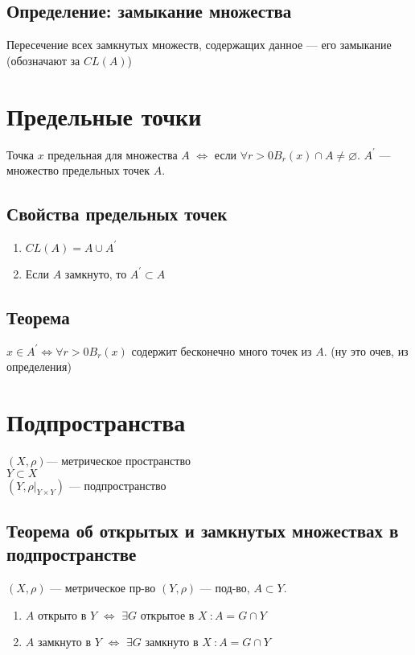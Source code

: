 \documentclass[12pt]{report} %
\begin{document}
\subsection*{Определение: замыкание множества}
Пересечение всех замкнутых множеств, содержащих данное --- его замыкание (обозначают за $CL(A)$)

\section*{Предельные точки}

Точка $x$ предельная для множества $A$ $\Leftrightarrow$ если $\forall r > 0 B_r(x) \cap A \neq \varnothing$. $A^{\prime}$ --- множество предельных точек $A$.

\subsection*{Свойства предельных точек}

\begin{enumerate}
\item $CL(A) = A \cup A^{\prime}$
\item Если $A$ замкнуто, то $A^{\prime} \subset A$
\end{enumerate}

\subsection*{Теорема}
$x \in A^{\prime} \Leftrightarrow \forall r > 0 B_r(x)$ содержит бесконечно много точек из $A$. (ну это очев, из определения)
\section*{Подпространства}
$(X, \rho)$--- метрическое пространство\\
$Y \subset X$\\
$(Y, \rho|_{Y \times Y})$ --- подпространство
\subsection*{Теорема об открытых и замкнутых множествах в подпространстве}
$(X, \rho)$ --- метрическое пр-во $(Y, \rho)$ --- под-во, $A \subset Y$.
\begin{enumerate}
\item $A$ открыто в $Y$ $\Leftrightarrow$ $\exists G$ открытое в $X \ : A = G \cap Y$
\item $A$ замкнуто в $Y$ $\Leftrightarrow$ $\exists G$ замкнуто в $X \ : A = G \cap Y$
\end{enumerate}
\end{document}
